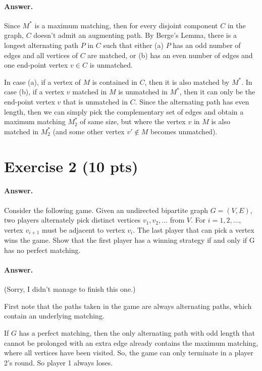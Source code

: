 \documentclass[a4paper]{article}
\begin{document}
\begin{itemize}
\paragraph{Answer.}

Since $M^{*}$ is a maximum matching, then for every disjoint component $C$ in the graph, $C$ doesn't admit an augmenting path. By Berge's Lemma, there is a longest alternating path $P$ in $C$ such that either (a) $P$ has an odd number of edges and all vertices of $C$ are matched, or (b) has an even number of edges and one end-point vertex $v \in C$ is unmatched.

In case (a), if a vertex of $M$ is contained in $C$, then it is also matched by $M^{*}$. In case (b), if a vertex $v$ matched in $M$ is unmatched in $M^{*}$, then it can only be the end-point vertex $v$ that is unmatched in $C$. Since the alternating path has even length, then we can simply pick the complementary set of edges and obtain a maximum matching $M^{*}_2$ of same size, but where the vertex $v$ in $M$ is also matched in $M^{*}_2$ (and some other vertex $v' \notin M$ becomes unmatched).

\end{itemize}



\section*{Exercise 2 (10 pts)}

\paragraph{Answer.}

Consider the following game. Given an undirected bipartite graph $G = (V, E)$, two players alternately pick distinct vertices $v_1, v_2, \ldots$ from $V$. For $i = 1, 2, \ldots$, vertex $v_{i+1}$ must be adjacent to vertex $v_i$. The last player that can pick a vertex wins the game. Show that the first player has a winning strategy if and only if G has no perfect matching.

\paragraph{Answer.}
(Sorry, I didn't manage to finish this one.)

First note that the paths taken in the game are always alternating paths, which contain an underlying matching.

If $G$ has a perfect matching, then the only alternating path with odd length that cannot be prolonged with an extra edge already contains the maximum matching, where all vertices have been visited. So, the game can only terminate in a player 2's round. So player 1 always loses.
\end{document}
